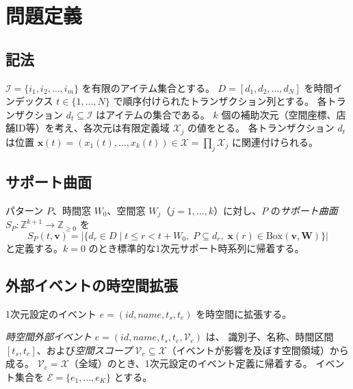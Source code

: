 \section{問題定義}\label{sec:problem}

\subsection{記法}

$\mathcal{I} = \{i_1, i_2, \ldots, i_m\}$ を有限のアイテム集合とする。
$D = [d_1, d_2, \ldots, d_N]$ を時間インデックス $t \in \{1, \ldots, N\}$ で順序付けられたトランザクション列とする。
各トランザクション $d_t \subseteq \mathcal{I}$ はアイテムの集合である。
$k$ 個の補助次元（空間座標、店舗ID等）を考え、各次元は有限定義域 $\mathcal{X}_j$ の値をとる。
各トランザクション $d_t$ は位置 $\mathbf{x}(t) = (x_1(t), \ldots, x_k(t)) \in \mathcal{X} = \prod_j \mathcal{X}_j$ に関連付けられる。

\subsection{サポート曲面}

\begin{definition}[多次元サポート曲面]\label{def:support_surface}
パターン $P$、時間窓 $W_0$、空間窓 $W_j$（$j = 1, \ldots, k$）に対し、$P$ の\emph{サポート曲面} $S_P : \mathbb{Z}^{k+1} \to \mathbb{Z}_{\geq 0}$ を
\begin{equation}\label{eq:support_surface}
S_P(t, \mathbf{v}) = \bigl|\{d_r \in D \mid t \leq r < t + W_0,\; P \subseteq d_r,\; \mathbf{x}(r) \in \mathrm{Box}(\mathbf{v}, \mathbf{W})\}\bigr|
\end{equation}
と定義する。$k = 0$ のとき標準的な1次元サポート時系列に帰着する。
\end{definition}

\subsection{外部イベントの時空間拡張}

1次元設定のイベント $e = (\textit{id}, \textit{name}, t_s, t_e)$ を時空間に拡張する。

\begin{definition}[時空間外部イベント]\label{def:st_event}
\emph{時空間外部イベント} $e = (\textit{id}, \textit{name}, t_s, t_e, \mathcal{V}_e)$ は、
識別子、名称、時間区間 $[t_s, t_e]$、および\emph{空間スコープ}
$\mathcal{V}_e \subseteq \mathcal{X}$（イベントが影響を及ぼす空間領域）から成る。
$\mathcal{V}_e = \mathcal{X}$（全域）のとき、1次元設定のイベント定義に帰着する。
イベント集合を $\mathcal{E} = \{e_1, \ldots, e_K\}$ とする。
\end{definition}

